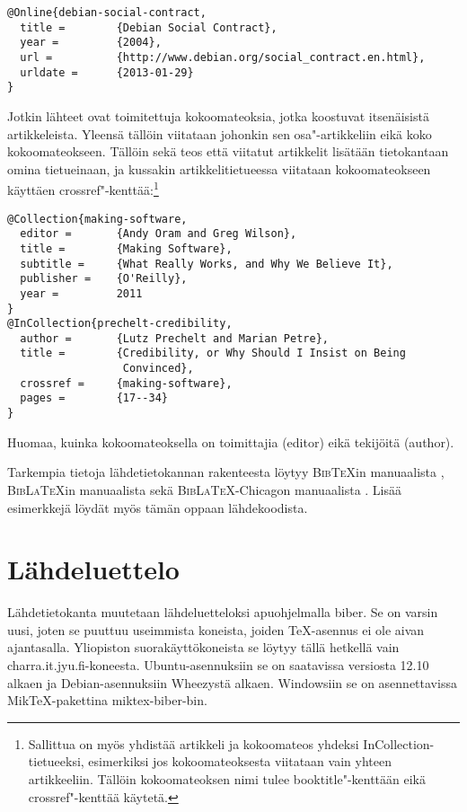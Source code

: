 \documentclass[utf8,bachelor]{gradu3}
\begin{document}
\begingroup\footnotesize
\begin{verbatim}
@Online{debian-social-contract,
  title =        {Debian Social Contract},
  year =         {2004},
  url =          {http://www.debian.org/social_contract.en.html},
  urldate =      {2013-01-29}
}
\end{verbatim}
\endgroup

Jotkin lähteet ovat toimitettuja kokoomateoksia, jotka koostuvat
itsenäisistä artikkeleista.  Yleensä tällöin viitataan johonkin sen
osa"-artikkeliin \parencite[esim.][]{prechelt-credibility} eikä koko
kokoomateokseen.  Tällöin sekä teos että viitatut artikkelit lisätään
tietokantaan omina tietueinaan, ja kussakin artikkelitietueessa
viitataan kokoomateokseen käyttäen
crossref"-kenttää:\footnote{Sallittua on myös yhdistää artikkeli ja
  kokoomateos yhdeksi InCollection-tietueeksi, esimerkiksi jos
  kokoomateoksesta viitataan vain yhteen artikkeeliin.  Tällöin
  kokoomateoksen nimi tulee booktitle"-kenttään eikä crossref"-kenttää
  käytetä.}

\begingroup\footnotesize
\begin{verbatim}
@Collection{making-software,
  editor =       {Andy Oram and Greg Wilson},
  title =        {Making Software},
  subtitle =     {What Really Works, and Why We Believe It},
  publisher =    {O'Reilly},
  year =         2011
}
@InCollection{prechelt-credibility,
  author =       {Lutz Prechelt and Marian Petre},
  title =        {Credibility, or Why Should I Insist on Being
                  Convinced},
  crossref =     {making-software},
  pages =        {17--34}
}
\end{verbatim}
\endgroup

Huomaa, kuinka kokoomateoksella on toimittajia (editor) eikä tekijöitä
(author).

Tarkempia tietoja lähdetietokannan rakenteesta löytyy
\textsc{Bib\TeX}in manuaalista \parencite{bibtexing},
\textsc{Bib\LaTeX}in manuaalista \parencite[luku~2]{biblatex-manual}
sekä \textsc{Bib\LaTeX}-Chicagon manuaalista
\parencite[luvut 5.1--5.2]{biblatex-chicago-manual}.  Lisää
esimerkkejä löydät myös tämän oppaan lähdekoodista.

\section{Lähdeluettelo}

Lähdetietokanta muutetaan lähdeluetteloksi apuohjelmalla {biber}.  Se
on varsin uusi, joten se puuttuu useimmista koneista, joiden
\TeX-asennus ei ole aivan ajantasalla.  Yliopiston suorakäyttökoneista
se löytyy tällä hetkellä vain charra.it.jyu.fi-koneesta.
Ubuntu-asennuksiin se on saatavissa versiosta 12.10 alkaen ja
Debian-asennuksiin Wheezystä alkaen.  Windowsiin se on asennettavissa
MikTeX-pakettina miktex-biber-bin.
\end{document}
